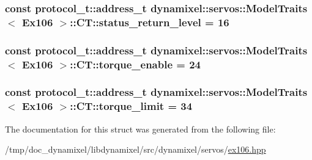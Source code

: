 \subsubsection[{status\+\_\+return\+\_\+level}]{\setlength{\rightskip}{0pt plus 5cm}const {\bf protocol\+\_\+t\+::address\+\_\+t} {\bf dynamixel\+::servos\+::\+Model\+Traits}$<$ {\bf Ex106} $>$\+::C\+T\+::status\+\_\+return\+\_\+level = 16\hspace{0.3cm}{\ttfamily [static]}}\label{structdynamixel_1_1servos_1_1_model_traits_3_01_ex106_01_4_1_1_c_t_a18861e77deef66e012ba2ac1375e55b0}
\hypertarget{structdynamixel_1_1servos_1_1_model_traits_3_01_ex106_01_4_1_1_c_t_acacef52f197552ea986e90a3c352277b}{}
\subsubsection[{torque\+\_\+enable}]{\setlength{\rightskip}{0pt plus 5cm}const {\bf protocol\+\_\+t\+::address\+\_\+t} {\bf dynamixel\+::servos\+::\+Model\+Traits}$<$ {\bf Ex106} $>$\+::C\+T\+::torque\+\_\+enable = 24\hspace{0.3cm}{\ttfamily [static]}}\label{structdynamixel_1_1servos_1_1_model_traits_3_01_ex106_01_4_1_1_c_t_acacef52f197552ea986e90a3c352277b}
\hypertarget{structdynamixel_1_1servos_1_1_model_traits_3_01_ex106_01_4_1_1_c_t_a0cf899dd3bc22ec35575ff77cd16754a}{}
\subsubsection[{torque\+\_\+limit}]{\setlength{\rightskip}{0pt plus 5cm}const {\bf protocol\+\_\+t\+::address\+\_\+t} {\bf dynamixel\+::servos\+::\+Model\+Traits}$<$ {\bf Ex106} $>$\+::C\+T\+::torque\+\_\+limit = 34\hspace{0.3cm}{\ttfamily [static]}}\label{structdynamixel_1_1servos_1_1_model_traits_3_01_ex106_01_4_1_1_c_t_a0cf899dd3bc22ec35575ff77cd16754a}


The documentation for this struct was generated from the following file\+:\begin{DoxyCompactItemize}
\item 
/tmp/doc\+\_\+dynamixel/libdynamixel/src/dynamixel/servos/\hyperlink{ex106_8hpp}{ex106.\+hpp}\end{DoxyCompactItemize}

